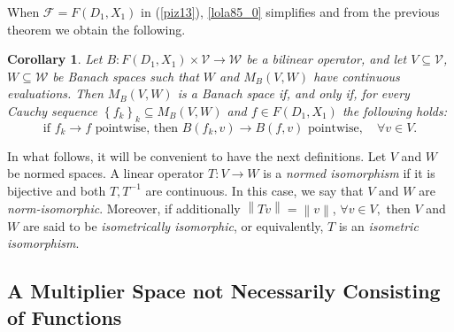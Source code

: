 \documentclass[14pt, a4paper]{article}  %
\providecommand{\llave}[1]{\left\lbrace #1\right\rbrace }
\providecommand{\pare}[1]{\left( #1\right) }
\providecommand{\norm}[1]{\left\lVert#1\right\rVert}
\newcommand{\tien}{\rightarrow}
\newcommand{\F}{\mathcal{F}}
\newcommand{\V}{\mathcal{V}}
\newcommand{\W}{\mathcal{W}}
\newtheorem{corollary}{Corollary}[section]
\begin{document}
 


When   $\F=F\pare{D_{1},X_{1}}$  in (\ref{piz13}), \ref{lola85_0} simplifies  and from the previous theorem  we obtain the following.
 

\begin{corollary}\label{d189_4} Let   $B:F\pare{D_{1},X_{1}}\times \V\tien \W$ be a bilinear operator, and let  $V\subseteq \V$, $W\subseteq \W$  be Banach spaces such that $W$ and $M_{B}\pare{V,W}$ have continuous evaluations. Then $M_{B}\pare{V,W}$ is a Banach space if, and only if, for every Cauchy sequence $\llave{f_{k}}_{k} \subseteq M_{B}\pare{V,W}$ and $f\in F\pare{D_{1},X_{1}}$ the following holds:  \begin{equation}\label{lola9}
	\text{if $f_{k}\tien f$ pointwise, then  $B\pare{f_{k},v} \tien B\pare{f,v}$  pointwise}, \quad \forall v\in V.
	\end{equation} 
\end{corollary}
 


In what follows, it will be convenient to have  the next  definitions.	Let  $V$ and $W$ be normed spaces. A linear operator $T:V\tien W$ is a \emph{normed isomorphism}  if it is bijective and both $T, T^{-1}$ are continuous. In this case, we say that $V$ and $W$ are \emph{norm-isomorphic}. Moreover, if additionally $\norm{Tv}=\norm{v}$, $\forall v\in V,$ then  $V$ and $W$ are said to be \emph{isometrically isomorphic}, or equivalently, $T$ is an \emph{isometric isomorphism}.
 
 \subsection{A  Multiplier Space not Necessarily Consisting of Functions}\label{lalo2}
\end{document}
